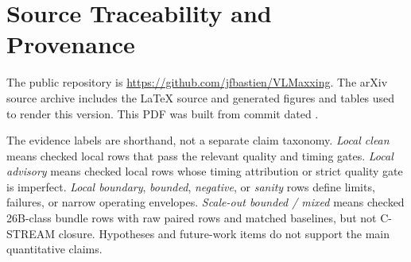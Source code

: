 \section{Source Traceability and Provenance}
\label{app:source-traceability}

The public repository is \url{https://github.com/jfbastien/VLMaxxing}.
The arXiv source archive includes the LaTeX source and generated figures and
tables used to render this version. This PDF was built from commit
\texttt{\PrimaryRepoSHA} dated \PrimaryRepoCommitDate.

\ifshowclaimmanifest
The evidence labels are shorthand, not a separate claim taxonomy. \emph{Local
clean} means checked local rows that pass the relevant quality and timing gates.
\emph{Local advisory} means checked local rows whose timing attribution or
strict quality gate is imperfect. \emph{Local boundary}, \emph{bounded},
\emph{negative}, or \emph{sanity} rows define limits, failures, or narrow
operating envelopes. \emph{Scale-out bounded / mixed} means checked 26B-class
bundle rows with raw paired rows and matched baselines, but not C-STREAM
closure. Hypotheses and future-work items do not support the main quantitative
claims.

